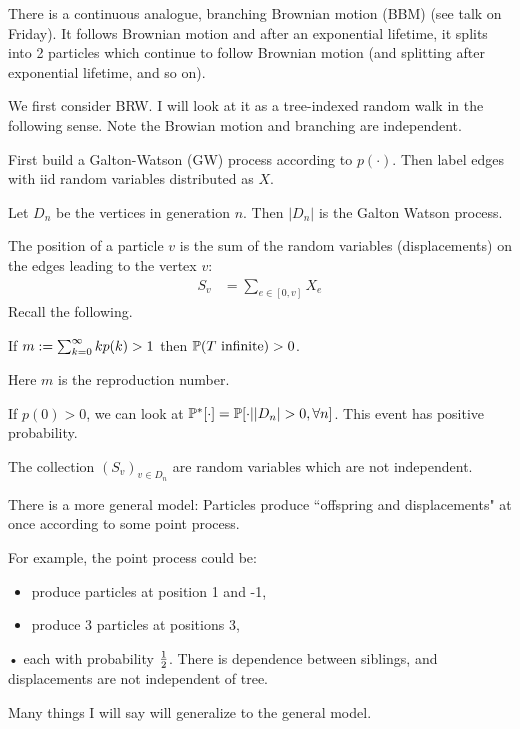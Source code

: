 There is a continuous analogue, branching Brownian motion (BBM) (see talk on Friday).
It follows Brownian motion and after an exponential lifetime, it splits into 2 particles which continue to follow Brownian motion (and splitting after exponential lifetime, and so on).

We first consider BRW. I will look at it as a tree-indexed random walk in the following sense. Note the Browian motion and branching are independent.

First build a Galton-Watson (GW) process according to $p(\cdot)$. Then label edges with iid random variables distributed as $X$.  

Let $D_n$ be the vertices in generation $n$. Then $|D_n|$ is the Galton Watson process.

The position of a particle $v$ is the sum of the random variables (displacements) on the edges leading to the vertex $v$: 
\begin{align*}
S_v &= \sum_{e\in [0,v]} X_e
\end{align*}
Recall the following.
\begin{thm}
If $m:=\sum_{k=0}^{\infty} kp(k)>1$ then $\mathbb{P}(T\text{ infinite})>0$.

Here $m$ is the reproduction number. %
\end{thm}
If $p(0)>0$, we can look at $\Pj^*[\cdot]  =\Pj[\cdot ||D_n|>0, \forall n]$. This event has positive probability.

The collection $(S_v)_{v\in D_n}$ are random variables which are not independent.


There is a more general model: 
Particles produce ``offspring and displacements" at once according to some point process.

For example, the point process could be:
\begin{itemize}
\item
produce particles at position 1 and -1,
\item
produce 3 particles at positions 3,
\end{itemize}•
each with probability $\frac{1}{2}$. There is dependence between siblings, and displacements are not independent of tree.

Many things I will say will generalize to the general model.

